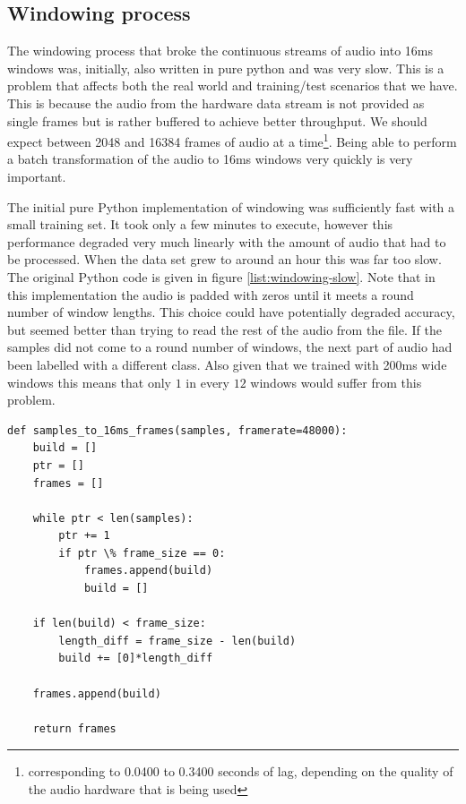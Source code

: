 \documentclass[ %
                    author={Sam Phippen},
                supervisor={Dr. Rafal Bogacz},
                     title={Real time voice activity detectors in noisy personal computing environments},
                  subtitle={},
                    degree={MEng},
                      year={2012} ]{thesis}
\begin{document}
\subsection{Windowing process}

The windowing process that broke the continuous streams of audio into 16ms
windows was, initially, also written in pure python and was very slow. This is
a problem that affects both the real world and training/test scenarios that we
have. This is because the audio from the hardware data stream is not provided
as single frames but is rather buffered to achieve better throughput. We should
expect between 2048 and 16384 frames of audio at a time\footnote{corresponding
    to 0.0400 to 0.3400 seconds of lag, depending on the quality of the audio
hardware that is being used}. Being able to perform a batch transformation of
the audio to 16ms windows very quickly is very important.

The initial pure Python implementation of windowing was sufficiently fast with
a small training set. It took only a few minutes to execute, however this
performance degraded very much linearly with the amount of audio that had to be
processed. When the data set grew to around an hour this was far too slow. The
original Python code is given in figure \ref{list:windowing-slow}. Note that in
this implementation the audio is padded with zeros until it meets a round
number of window lengths. This choice could have potentially degraded accuracy,
but seemed better than trying to read the rest of the audio from the file. If
the samples did not come to a round number of windows, the next part of audio
had been labelled with a different class. Also given that we trained with 200ms
wide windows this means that only $1$ in every $12$ windows would suffer from
this problem.


\begin{lstlisting}[frame=single,caption=Original slow windowing implementation, label=list:windowing-slow]
def samples_to_16ms_frames(samples, framerate=48000):
    build = []
    ptr = []
    frames = []

    while ptr < len(samples):
        ptr += 1
        if ptr \% frame_size == 0:
            frames.append(build)
            build = []

    if len(build) < frame_size:
        length_diff = frame_size - len(build)
        build += [0]*length_diff

    frames.append(build)

    return frames

\end{lstlisting}
\end{document}
